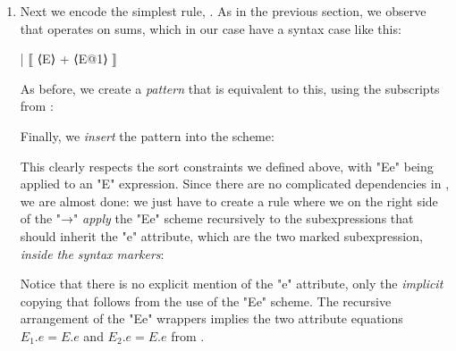 \documentclass[11pt]{article} %
\begin{document}
\begin{enumerate}
\item Next we encode the simplest rule, . As in the previous section, we observe that
   operates on sums, which in our case have a syntax case like this:
\begin{hacs}
   | ⟦ ⟨E⟩ + ⟨E@1⟩ ⟧
\end{hacs}
  As before, we create a \emph{pattern} that is equivalent to this, using the subscripts from :
   Finally, we \emph{insert} the pattern into the scheme:
  This clearly respects the sort constraints we defined above, with "Ee" being applied to an "E"
  expression. Since there are no complicated dependencies in , we are almost done: we just
  have to create a rule where we on the right side of the "→" \emph{apply} the "Ee" scheme
  recursively to the subexpressions that should inherit the "e" attribute, which are the two marked
  subexpression, \emph{inside the syntax markers}:
  Notice that there is no explicit mention of the "e" attribute, only the \emph{implicit} copying
  that follows from the use of the "Ee" scheme. The recursive  arrangement of the "Ee" wrappers
  implies the two attribute equations $E_1.e=E.e$ and $E_2.e=E.e$ from .


\end{enumerate}
\end{document}
